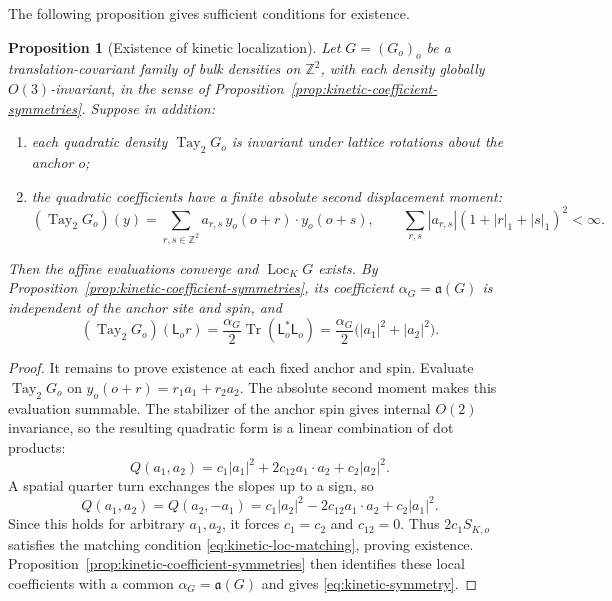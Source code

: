 \documentclass[11pt]{article}
\newcommand{\tr}{\operatorname{Tr}}
\newcommand{\Tay}{\operatorname{Tay}}
\newcommand{\Loc}{\operatorname{Loc}}
\numberwithin{equation}{section}
\newtheorem{proposition}[theorem]{Proposition}
\theoremstyle{definition}
\theoremstyle{plain}
\begin{document}
The following proposition gives sufficient conditions for existence.


\begin{proposition}[Existence of kinetic localization]
\label{prop:kinetic-symmetry}
Let $G=(G_o)_o$ be a translation-covariant family of bulk
densities on $\mathbb Z^2$, with each density globally
$O(3)$-invariant, in the sense of
Proposition~\ref{prop:kinetic-coefficient-symmetries}.
Suppose in addition:
\begin{enumerate}
\item each quadratic density $\Tay_2G_o$ is invariant under
lattice rotations about the anchor $o$;
\item the quadratic coefficients have a finite absolute second
displacement moment:
\begin{equation}
 (\Tay_2 G_o)(y)=\sum_{r,s\in\mathbb Z^2}a_{r,s}\,
              y_o(o+r)\cdot y_o(o+s),
 \qquad
 \sum_{r,s}|a_{r,s}|(1+|r|_1+|s|_1)^2<\infty.
 \label{eq:affine-hessian-domain}
\end{equation}
\end{enumerate}
Then the affine evaluations converge and $\Loc_K G$ exists.
By Proposition~\ref{prop:kinetic-coefficient-symmetries}, its
coefficient $\alpha_G=\mathfrak a(G)$ is independent of the
anchor site and spin, and
\begin{equation}
 (\Tay_2 G_o)(\mathsf L_o r)
 =\frac{\alpha_G}2\tr(\mathsf L_o^*\mathsf L_o)
 =\frac{\alpha_G}2\bigl(|a_1|^2+|a_2|^2\bigr).
 \label{eq:kinetic-symmetry}
\end{equation}
\end{proposition}

\begin{proof}
It remains to prove existence at each fixed anchor and spin.
Evaluate $\Tay_2 G_o$ on $y_o(o+r)=r_1a_1+r_2a_2$.
The absolute second moment makes this evaluation summable.
The stabilizer of the anchor spin gives internal $O(2)$
invariance, so the resulting quadratic form
is a linear combination of dot products:
\begin{equation}
 Q(a_1,a_2)
 =c_1|a_1|^2+2c_{12}a_1\cdot a_2+c_2|a_2|^2.
\end{equation}
A spatial quarter turn exchanges the slopes up to a sign, so
\begin{equation}
 Q(a_1,a_2)=Q(a_2,-a_1)
 =c_1|a_2|^2-2c_{12}a_1\cdot a_2+c_2|a_1|^2.
\end{equation}
Since this holds for arbitrary $a_1,a_2$, it forces
$c_1=c_2$ and $c_{12}=0$.  Thus $2c_1S_{K,o}$ satisfies
the matching condition \eqref{eq:kinetic-loc-matching}, proving
existence.  Proposition~\ref{prop:kinetic-coefficient-symmetries}
then identifies these local coefficients with a common
$\alpha_G=\mathfrak a(G)$ and gives \eqref{eq:kinetic-symmetry}.
\end{proof}
\end{document}
